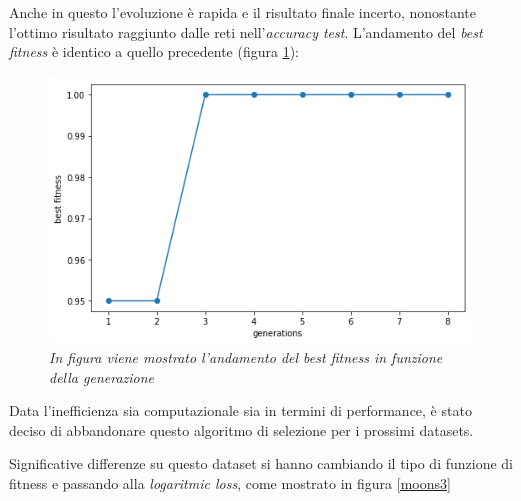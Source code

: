 \documentclass[12pt,a4paper]{report}
\begin{document}
Anche in questo l'evoluzione è rapida e il risultato finale incerto, nonostante l'ottimo risultato raggiunto dalle reti nell'\textit{accuracy test}. L'andamento del \textit{best fitness} è identico a quello precedente (figura \ref{best2}):

\begin{figure}[H]
 \centering
 \includegraphics[scale = 0.4]{images/moons-sons-acc./best}
 \caption{\textit{In figura viene mostrato l'andamento del best fitness in funzione della generazione}}
 \label{best2}
\end{figure}

Data l'inefficienza sia computazionale sia in termini di performance, è stato deciso di abbandonare questo algoritmo di selezione per i prossimi datasets.


Significative differenze su questo dataset si hanno cambiando il tipo di funzione di fitness e passando alla \textit{logaritmic loss}, come mostrato in figura \ref{moons3}
\end{document}
